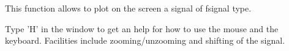 This function allows to plot on the screen a signal of fsignal type.

Type 'H' in the window to get an help for how to use the mouse and
the keyboard.
Facilities include zooming/unzooming and shifting of the signal.
